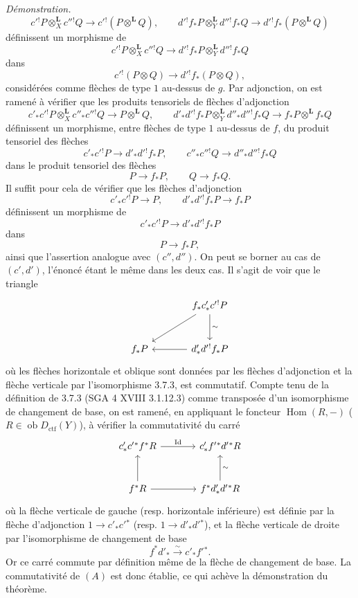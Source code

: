 \documentclass[11pt]{article}
\newenvironment{prooftext}[1][Proof]{\par\noindent\emph{#1.}\ }{\par\medskip}
\DeclareMathOperator{\Hom}{Hom}
\newcommand{\ob}{\operatorname{ob}}
\providecommand{\Dctf}{D_{\mathrm{ctf}}}
\providecommand{\Id}{\mathrm{Id}}
\providecommand{\lisom}{\xrightarrow{\sim}}
\providecommand{\Dctf}{D_{\mathrm{ctf}}}
\providecommand{\Hom}{\operatorname{Hom}}
\providecommand{\ob}{\operatorname{ob}}
\begin{document}
\begin{prooftext}[Démonstration]
\[
c'{}^!P\otimes_X^{\mathbf L}c''{}^!Q\longrightarrow c'{}^!(P\otimes^{\mathbf L}Q),\qquad
d'{}^!f_*P\otimes_Y^{\mathbf L}d''{}^!f_*Q\longrightarrow d'{}^!f_*(P\otimes^{\mathbf L}Q)
\]
définissent un morphisme de
\[
c'{}^!P\otimes_X^{\mathbf L}c''{}^!Q\longrightarrow d'{}^!f_*P\otimes_Y^{\mathbf L}d''{}^!f_*Q
\]
dans
\[
c'{}^!(P\otimes Q)\longrightarrow d'{}^!f_*(P\otimes Q),
\]
considérées comme flèches de type $1$ au-dessus de $g$. Par adjonction, on est ramené à vérifier que les produits tensoriels de flèches d'adjonction
\[
c'_*c'{}^!P\otimes_X^{\mathbf L}c''_*c''{}^!Q\longrightarrow P\otimes^{\mathbf L}Q,
\qquad
d'_*d'{}^!f_*P\otimes_Y^{\mathbf L}d''_*d''{}^!f_*Q
\longrightarrow f_*P\otimes^{\mathbf L}f_*Q
\]
définissent un morphisme, entre flèches de type $1$ au-dessus de $f$, du produit tensoriel des flèches
\[
c'_*c'{}^!P\longrightarrow d'_*d'{}^!f_*P,\qquad
c''_*c''{}^!Q\longrightarrow d''_*d''{}^!f_*Q
\]
dans le produit tensoriel des flèches
\[
P\longrightarrow f_*P,\qquad Q\longrightarrow f_*Q.
\]
Il suffit pour cela de vérifier que les flèches d'adjonction
\[
c'_*c'{}^!P\longrightarrow P,\qquad d'_*d'{}^!f_*P\longrightarrow f_*P
\]
définissent un morphisme de
\[
c'_*c'{}^!P\longrightarrow d'_*d'{}^!f_*P
\]
dans
\[
P\longrightarrow f_*P,
\]
ainsi que l'assertion analogue avec $(c'',d'')$. On peut se borner au cas de $(c',d')$, l'énoncé étant le même dans les deux cas. Il s'agit de voir que le triangle
\[
\begin{tikzcd}[column sep=large,row sep=large]
& f_*c'_*c'{}^!P \arrow[d,"\sim"]\arrow[dl]\\
f_*P & d'_*d'{}^!f_*P\arrow[l]
\end{tikzcd}
\]
où les flèches horizontale et oblique sont données par les flèches d'adjonction et la flèche verticale par l'isomorphisme 3.7.3, est commutatif. Compte tenu de la définition de 3.7.3 (SGA 4 XVIII 3.1.12.3) comme transposée d'un isomorphisme de changement de base, on est ramené, en appliquant le foncteur $\Hom(R,-)$ ($R\in\ob\Dctf(Y)$), à vérifier la commutativité du carré
\[
\begin{tikzcd}[column sep=large,row sep=large]
c'_*c'{}^*f^*R \arrow[r,"\Id"] &
c'_*f'{}^*d'{}^*R\\
f^*R \arrow[u] \arrow[r] &
f^*d'_*d'{}^*R\arrow[u,"\sim"']
\end{tikzcd}
\]
où la flèche verticale de gauche (resp. horizontale inférieure) est définie par la flèche d'adjonction $1\longrightarrow c'_*c'{}^*$ (resp. $1\longrightarrow d'_*d'{}^*$), et la flèche verticale de droite par l'isomorphisme de changement de base
\[
f^*d'_*\lisom c'_*f'{}^*.
\]
Or ce carré commute par définition même de la flèche de changement de base. La commutativité de $(A)$ est donc établie, ce qui achève la démonstration du théorème.
\end{prooftext}
\end{document}
